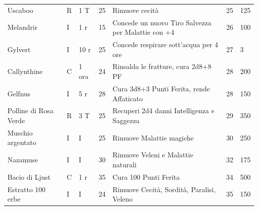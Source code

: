 \begin{xltabular}{\linewidth}{llllXll}
 Uscaboo & R& 1 T & 25& Rimuove cecità& 25 & 125 \\
	Melandrir & I& 1 r & 15& Concede un nuovo Tiro Salvezza per Malattie con +4& 26 & 100 \\
 Gylvert & I& 10 r& 25& Concede respirare sott'acqua per 4 ore & 27 & 3 \\
	Callynthine & C& 1 ora& 24& Rinsalda le fratture, cura 2d8+8 PF & 28 & 200\\
 Gelfnus & I& 5 r & 28& Cura 3d8+3 Punti Ferita, rende Affaticato & 28 & 150 \\
	Polline di Rosa Verde & R& 3 T & 25& Recuperi 2d4 danni Intelligenza e Saggezza& 29 & 350 \\
 Muschio argentato & I& I& 25& Rimuove Malattie magiche & 30 & 250\\
	Nazamuse & I& I& 30& Rimuove Veleni e Malattie naturali & 32 & 175\\
 Bacio di Ljust & C& 1 r & 35& Cura 100 Punti Ferita& 34 & 500\\
	Estratto 100 erbe & I& I& 24& Rimuove Cecità, Sordità, Paralisi, Veleno &35&150 \\
\end{xltabular}


